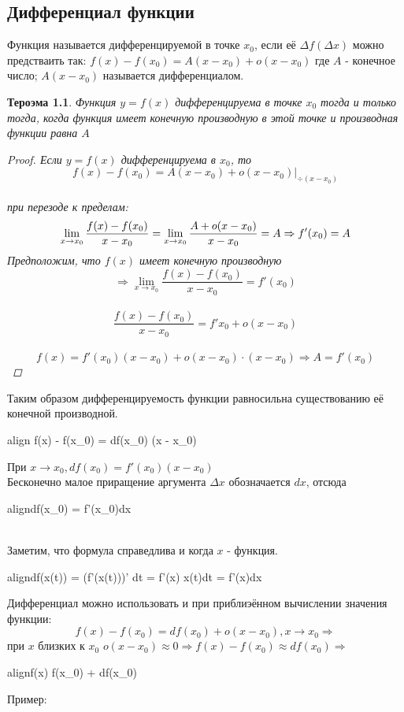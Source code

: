 \documentclass[oneside]{book}
\newcommand{\boxedeq}[2]{\begin{empheq}[box={\fboxsep=6pt\fbox}]{align}\label{#1}#2\end{empheq}}
\newtheorem{thm}{Тероэма}[chapter] %
\begin{document}
\begin{enumerate}
\begin{itemize}
\chapter{Дифференциал функции\\}

Функция называется дифференцируемой в точке $x_0$, если её $\Delta f(\Delta x)$ можно предстваить так:
$f(x) - f(x_0) = A(x - x_0) + o(x - x_0)$ где $A$ - конечное число; $A(x - x_0)$ называется дифференциалом.
\begin{thm}
    Функция $y = f(x)$ дифференцируема в точке $x_0$ тогда и только тогда, когда функция имеет конечную производную в этой точке
    и производная функции равна $A$
    \begin{proof}
      Если $y = f(x)$ дифференцируема в $x_0$, то
      $$f(x) - f(x_0) = A(x-x_0) + o(x - x_0)\vert_{\div (x - x_0)}$$ \\
      при перезоде к пределам:
      $$\lim_{x \rightarrow x_0}{\frac{f(x) - f(x_0)}{x - x_0}} = \lim_{x \rightarrow x_0}{\frac{A+o(x-x_0)}{x-x_0}} = \large{A} \Rightarrow f'(x_0) = A$$
		Предположим, что $f(x)$ имеет конечную производную $$ \Rightarrow \lim_{x \rightarrow x_0}{\frac{f(x) - f(x_0)}{x - x_0}} =
		f'(x_0)$$ \\
		$$\frac{f(x) - f(x_0)}{x - x_0} = f'{x_0} + o(x-x_0)$$ \\ $$
		f(x) = f'(x_0)(x - x_0) + o(x-x_0) \cdot (x-x_0) \Rightarrow A = f'(x_0)$$
    \end{proof}
\end{thm}
Таким образом дифференцируемость функции равносильна существованию её конечной производной.
\boxedeq{eq:*}{ f(x) - f(x_0) = df(x_0) \cdot (x - x_0)}
При $x \rightarrow x_0, df(x_0) = f'(x_0)(x - x_0)$ \\
Бесконечно малое приращение аргумента $\Delta x$ обозначается $dx$, отсюда
\boxedeq{eq:*}{df(x_0) = f'(x_0)dx} \\

Заметим, что формула справедлива и когда $x$ - функция.
\boxedeq{eq:*}{df(x(t)) = (f'(x(t)))' dt = f'(x) \cdot x(t)dt = f'(x)dx}

Дифференциал можно использовать и при приблиэённом вычислении значения функции:\\
$$f(x) - f(x_0) = df(x_0) + o(x - x_0), x \rightarrow x_0 \Rightarrow$$ при $x$ близких к $x_0$
$o(x- x_0) \approx 0 \Rightarrow f(x) - f(x_0) \approx df(x_0) \Rightarrow$ \\
\boxedeq{eq:*}{f(x) \approx f(x_0) + df(x_0)}
\begin{center}
  Пример:
\end{center}


\end{itemize}
\end{enumerate}
\end{document}
